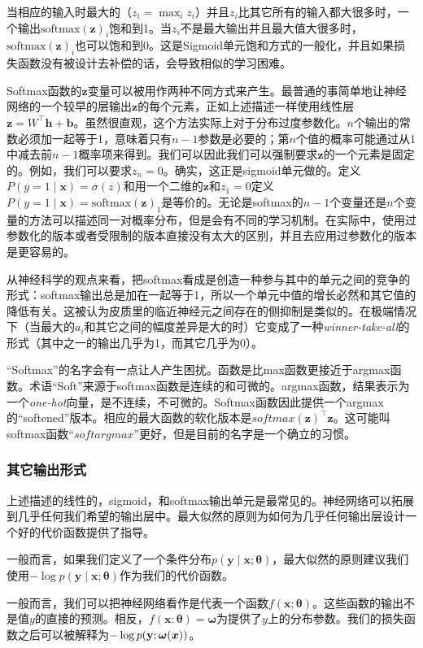 当相应的输入时最大的（$z_i = \max_i z_i$）并且$z_i$比其它所有的输入都大很多时，一个输出$\text{softmax}(\bm{z})_i$饱和到1。当$z_i$不是最大输出并且最大值大很多时，$\text{softmax}(\bm{z})_i$也可以饱和到0。这是Sigmoid单元饱和方式的一般化，并且如果损失函数没有被设计去补偿的话，会导致相似的学习困难。

Softmax函数的$\bm{z}$变量可以被用作两种不同方式来产生。最普通的事简单地让神经网络的一个较早的层输出$\bm{z}$的每个元素，正如上述描述一样使用线性层$\bm{z}={W}^\top\bm{h}+\bm{b}$。虽然很直观，这个方法实际上对于分布过度参数化。$n$个输出的常数必须加一起等于1，意味着只有$n-1$参数是必要的；第$n$个值的概率可能通过从1中减去前$n-1$概率项来得到。我们可以因此我们可以强制要求$\bm{z}$的一个元素是固定的。例如，我们可以要求$z_n=0$。确实，这正是sigmoid单元做的。定义$P(y=1\mid\bm{x})=\sigma(z)$和用一个二维的$\bm{z}$和$z_1=0$定义$P(y=1\mid\bm{x})=\text{softmax}(\bm{z})_1$是等价的。无论是softmax的$n-1$个变量还是$n$个变量的方法可以描述同一对概率分布，但是会有不同的学习机制。在实际中，使用过参数化的版本或者受限制的版本直接没有太大的区别，并且去应用过参数化的版本是更容易的。

从神经科学的观点来看，把softmax看成是创造一种参与其中的单元之间的竞争的形式：softmax输出总是加在一起等于1，所以一个单元中值的增长必然和其它值的降低有关。这被认为皮质里的临近神经元之间存在的侧抑制是类似的。在极端情况下（当最大的$a_i$和其它之间的幅度差异是大的时）它变成了一种\emph{winner-take-all}的形式（其中之一的输出几乎为1，而其它几乎为0）。

“Softmax”的名字会有一点让人产生困扰。函数是比max函数更接近于argmax函数。术语“Soft”来源于softmax函数是连续的和可微的。argmax函数，结果表示为一个\emph{one-hot}向量，是不连续，不可微的。Softmax函数因此提供一个argmax的“softened”版本。相应的最大函数的软化版本是$softmax(\bm{z})^\top \bm{z}$。这可能叫softmax函数“$softargmax$”更好，但是目前的名字是一个确立的习惯。

\subsubsection{其它输出形式}
\label{sec:6.2.2.4}
上述描述的线性的，sigmoid，和softmax输出单元是最常见的。神经网络可以拓展到几乎任何我们希望的输出层中。最大似然的原则为如何为几乎任何输出层设计一个好的代价函数提供了指导。

一般而言，如果我们定义了一个条件分布$p(\bm{y}\mid\bm{x}; \bm{\theta})$，最大似然的原则建议我们使用$-\log p(\bm{y}\mid \bm{x};\bm{\theta})$作为我们的代价函数。

一般而言，我们可以把神经网络看作是代表一个函数$f(\bm{x};\bm{\theta})$。这些函数的输出不是值$y$的直接的预测。相反，$f(\bm{x}:\bm{\theta})=\bm{\omega}$为提供了$y$上的分布参数。我们的损失函数之后可以被解释为$-\log p(\mathbf{y}; \bm{\omega}(\bm{x}))$。

